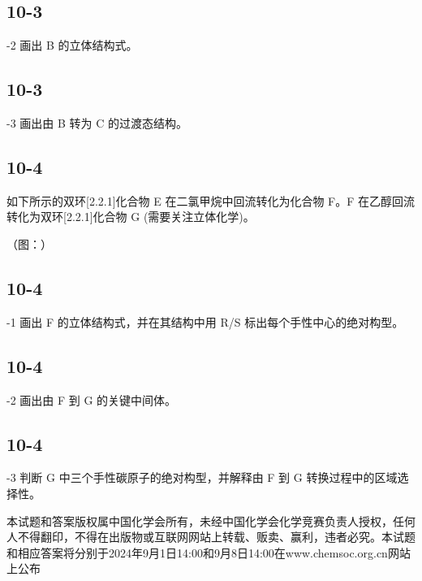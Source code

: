 \subsection*{10-3}
-2 画出 B 的立体结构式。

\subsection*{10-3}
-3 画出由 B 转为 C 的过渡态结构。

\subsection*{10-4}
如下所示的双环[2.2.1]化合物 E 在二氯甲烷中回流转化为化合物 F。F 在乙醇回流转化为双环[2.2.1]化合物 G (需要关注立体化学)。

（图：）

\subsection*{10-4}
-1 画出 F 的立体结构式，并在其结构中用 R/S 标出每个手性中心的绝对构型。

\subsection*{10-4}
-2 画出由 F 到 G 的关键中间体。

\subsection*{10-4}
-3 判断 G 中三个手性碳原子的绝对构型，并解释由 F 到 G 转换过程中的区域选择性。

本试题和答案版权属中国化学会所有，未经中国化学会化学竞赛负责人授权，任何人不得翻印，不得在出版物或互联网网站上转载、贩卖、赢利，违者必究。本试题和相应答案将分别于2024年9月1日14:00和9月8日14:00在www.chemsoc.org.cn网站上公布
